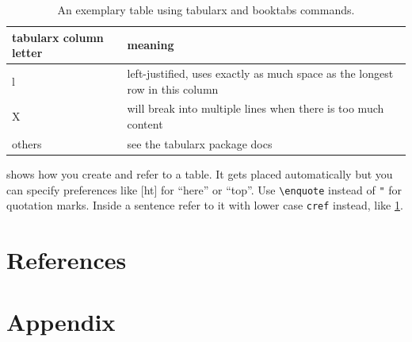 \documentclass[headsepline,titlepage,twoside,12pt,toc=flat,headings=normal]{scrreprt}
\begin{document}
\begin{table}[ht]
\begin{tabularx}{\textwidth}{lX}
\toprule
tabularx column letter	&meaning\\
\midrule
l						&left-justified, uses exactly as much space as the longest row in this column \\
X						&will break into multiple lines when there is too much content\\
others					&see the tabularx package docs\\
\bottomrule
\end{tabularx}
\caption{An exemplary table using tabularx and booktabs commands.}
\label{tab:example}
\end{table}

 shows how you create and refer to a table.
It gets placed automatically but you can specify preferences like [ht] for \enquote{here} or \enquote{top}.
Use \verb+\enquote+ instead of \verb+"+ for quotation marks.
Inside a sentence refer to it with lower case \verb+cref+ instead, like \cref{tab:example}.


\chapter{References}\label{ch:references}

%

\chapter{Appendix}\label{ch:appendix}
\end{document}
